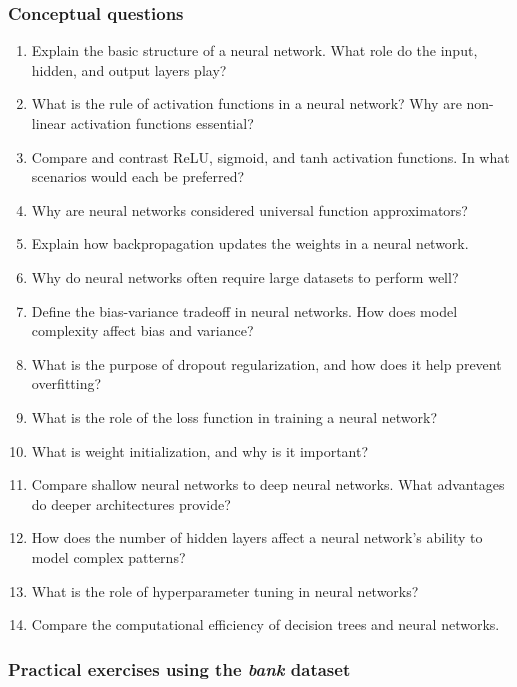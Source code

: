 \documentclass[
  11pt,
]{book}
\providecommand{\tightlist}{%
  \setlength{\itemsep}{0pt}\setlength{\parskip}{0pt}}
\theoremstyle{definition}
\theoremstyle{definition}
\theoremstyle{definition}
\theoremstyle{definition}
\theoremstyle{remark}
\begin{document}
\subsubsection*{Conceptual questions}\label{conceptual-questions-10}


\begin{enumerate}
\def\labelenumi{\arabic{enumi}.}
\tightlist
\item
  Explain the basic structure of a neural network. What role do the input, hidden, and output layers play?
\item
  What is the rule of activation functions in a neural network? Why are non-linear activation functions essential?
\item
  Compare and contrast ReLU, sigmoid, and tanh activation functions. In what scenarios would each be preferred?
\item
  Why are neural networks considered universal function approximators?
\item
  Explain how backpropagation updates the weights in a neural network.
\item
  Why do neural networks often require large datasets to perform well?
\item
  Define the bias-variance tradeoff in neural networks. How does model complexity affect bias and variance?
\item
  What is the purpose of dropout regularization, and how does it help prevent overfitting?
\item
  What is the role of the loss function in training a neural network?
\item
  What is weight initialization, and why is it important?
\item
  Compare shallow neural networks to deep neural networks. What advantages do deeper architectures provide?
\item
  How does the number of hidden layers affect a neural network's ability to model complex patterns?
\item
  What is the role of hyperparameter tuning in neural networks?
\item
  Compare the computational efficiency of decision trees and neural networks.
\end{enumerate}

\subsubsection*{\texorpdfstring{Practical exercises using the \emph{bank} dataset}{Practical exercises using the bank dataset}}\label{practical-exercises-using-the-bank-dataset-1}
\end{document}
